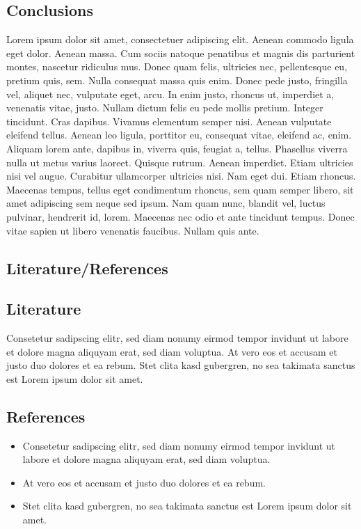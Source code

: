 \documentclass[a1paper, english]{article}
\begin{document}
\vfill

\begin{posterbox}
	\section*{Conclusions}
	Lorem ipsum dolor sit amet, consectetuer adipiscing elit. Aenean commodo ligula eget dolor. Aenean massa. Cum sociis natoque penatibus et magnis dis parturient montes, nascetur ridiculus mus. Donec quam felis, ultricies nec, pellentesque eu, pretium quis, sem. Nulla consequat massa quis enim. Donec pede justo, fringilla vel, aliquet nec, vulputate eget, arcu. In enim justo, rhoncus ut, imperdiet a, venenatis vitae, justo. Nullam dictum felis eu pede mollis pretium. Integer tincidunt. Cras dapibus. Vivamus elementum semper nisi. Aenean vulputate eleifend tellus. Aenean leo ligula, porttitor eu, consequat vitae, eleifend ac, enim. Aliquam lorem ante, dapibus in, viverra quis, feugiat a, tellus. Phasellus viverra nulla ut metus varius laoreet. Quisque rutrum. Aenean imperdiet. Etiam ultricies nisi vel augue. Curabitur ullamcorper ultricies nisi. Nam eget dui. Etiam rhoncus. Maecenas tempus, tellus eget condimentum rhoncus, sem quam semper libero, sit amet adipiscing sem neque sed ipsum. Nam quam nunc, blandit vel, luctus pulvinar, hendrerit id, lorem. Maecenas nec odio et ante tincidunt tempus. Donec vitae sapien ut libero venenatis faucibus. Nullam quis ante.
\end{posterbox}

\vfill

\begin{posterbox}
	\section*{Literature/References}
	\subsection*{Literature}
	Consetetur sadipscing elitr, sed diam nonumy eirmod tempor invidunt ut labore et dolore magna aliquyam erat, sed diam voluptua. At vero eos et accusam et justo duo dolores et ea rebum. Stet clita kasd gubergren, no sea takimata sanctus est Lorem ipsum dolor sit amet.

	\subsection*{References}
	\begin{itemize}
		\item Consetetur sadipscing elitr, sed diam nonumy eirmod tempor invidunt ut labore et dolore magna aliquyam erat, sed diam voluptua.
		\item At vero eos et accusam et justo duo dolores et ea rebum.
		\item Stet clita kasd gubergren, no sea takimata sanctus est Lorem ipsum dolor sit amet.
	\end{itemize}
\end{posterbox}
\end{document}
